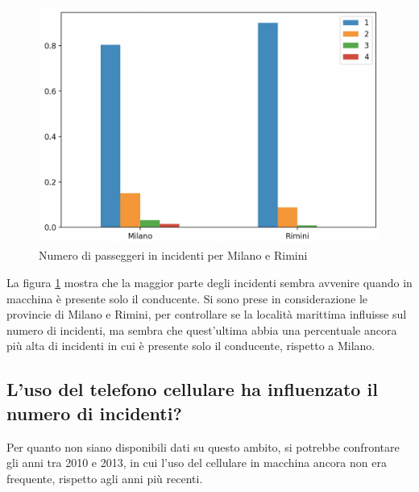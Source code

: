 \documentclass[a4paper]{report}
\begin{document}
\begin{figure}
    \includegraphics[width=\linewidth]{../src/incidenti/incidenti_senza_coords/tipo_veicoli/passeggeri.png}
    \caption{Numero di passeggeri in incidenti per Milano e Rimini}
    \label{fig:passeggeri-milano-rimini}
\end{figure}

La figura \ref{fig:passeggeri-milano-rimini} mostra che la maggior parte degli incidenti 
sembra avvenire quando in macchina è presente solo il conducente.
Si sono prese in considerazione le provincie di Milano e Rimini, per controllare se la località 
marittima influisse sul numero di incidenti, ma sembra che quest'ultima abbia una percentuale 
ancora più alta di incidenti in cui è presente solo il conducente, rispetto a Milano.


\subsection{L'uso del telefono cellulare ha influenzato il numero di incidenti?}

Per quanto non siano disponibili dati su questo ambito, si potrebbe confrontare gli anni tra 2010 e 2013, 
in cui l'uso del cellulare in macchina ancora non era frequente, rispetto agli anni più recenti.
\end{document}
